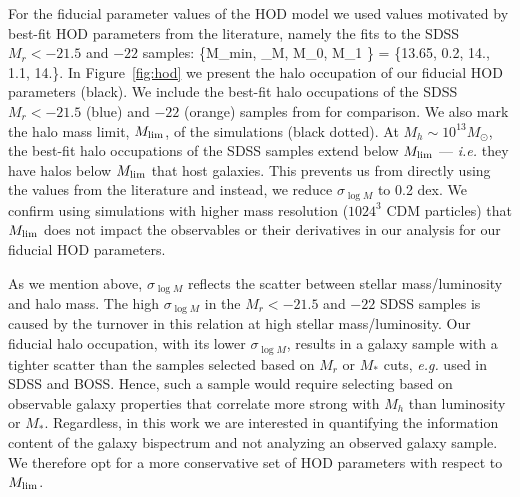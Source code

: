 For the fiducial parameter values of the HOD model we used values motivated by 
best-fit HOD parameters from the literature, namely the \cite{zheng2007} 
fits to the SDSS $M_r < -21.5$  and $-22$ samples: 
\beq \label{eq:hod_fid}
\{M_{\rm min}, \sigma_{\log M}, \log M_0, \alpha \log M_1 \} = \{13.65, 0.2, 14., 1.1, 14.\}.
\eeq
In Figure~\ref{fig:hod} we present the halo occupation of our fiducial 
HOD parameters (black). We include the best-fit halo occupations of 
the SDSS $M_r < -21.5$ (blue)  and $-22$ (orange) samples from \cite{zheng2007}
for comparison. We also mark the halo mass limit, $M_{\rm lim}$, of the \quij 
simulations (black dotted). At $M_h \sim 10^{13} M_\odot$, the best-fit halo 
occupations of the SDSS samples extend below $M_{\rm lim}$ --- \emph{i.e.} 
they have halos below $M_{\rm lim}$ that host galaxies. This prevents us from 
directly using the values from the literature and instead, we reduce 
$\sigma_{\log M}$ to 0.2 dex. We confirm using \quij simulations with higher 
mass resolution ($1024^3$ CDM particles) that $M_{\rm lim}$ does not impact
the observables or their derivatives in our analysis for our fiducial HOD 
parameters. 

As we mention above, $\sigma_{\log M}$ reflects the scatter between stellar 
mass/luminosity and halo mass. The high $\sigma_{\log M}$ in the $M_r < -21.5$ 
and $-22$ SDSS samples is caused by the turnover in this relation at high stellar 
mass/luminosity. Our fiducial halo occupation, with its lower $\sigma_{\log M}$, 
results in a galaxy sample with a tighter scatter than the samples selected based 
on $M_r$ or $M_*$ cuts, \emph{e.g.} used in SDSS and BOSS. Hence, such a sample
would require selecting based on observable galaxy properties that correlate 
more strong with $M_h$ than luminosity or $M_*$.  Regardless, in this work
we are interested in quantifying the information content of the galaxy bispectrum 
and not analyzing an observed galaxy sample. We therefore opt for a more 
conservative set of HOD parameters with respect to $M_{\rm lim}$. 
